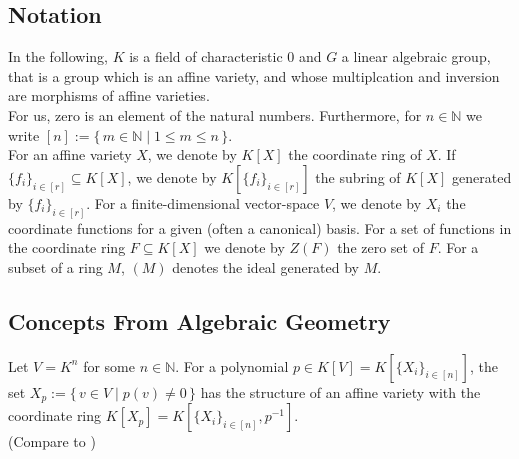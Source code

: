 \subsection{Notation}

In the following, $K$ is a field of characteristic $0$ and $G$ a linear algebraic group, that is a group which is an affine variety, and whose multiplcation and inversion are morphisms of affine varieties.  \\
For us, zero is an element of the natural numbers.
Furthermore, for $n \in \mathbb{N}$ we write $[n] := \{\, m \in \mathbb{N} \mid 1 \leq m \leq n \,\}$.  \\
For an affine variety $X$, we denote by $K[X]$ the coordinate ring of $X$.
If $\{f_i\}_{i\in[r]} \subseteq K[X]$, we denote by $K[\{f_i\}_{i\in[r]}]$ the subring of $K[X]$ generated by $\{f_i\}_{i\in[r]}$.
For a finite-dimensional vector-space $V$, we denote by $X_i$ the coordinate functions for a given (often a canonical) basis.
For a set of functions in the coordinate ring $F \subseteq K[X]$ we denote by $Z(F)$ the zero set of $F$. %
For a subset of a ring $M$, $(M)$ denotes the ideal generated by $M$.

\subsection{Concepts From Algebraic Geometry}

\begin{proposition}\label{rabbi}
  Let $V = K^n$ for some $n \in \mathbb{N}$.
  For a polynomial $p \in K[V] = K[\{X_i\}_{i\in[n]}]$, the set $ X_p := \{\, v \in V \mid p(v) \neq 0 \,\}$ has the structure of an affine variety with the coordinate ring $K[X_p] = K[\{X_i\}_{i \in [n]}, p^{-1}]$.  \\
  (Compare to \cite{Rab30})
\end{proposition}

